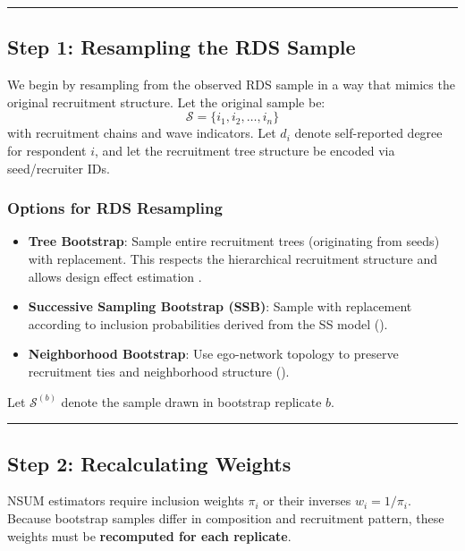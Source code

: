 \documentclass[
  12pt,
  letterpaper,
  DIV=11,
  numbers=noendperiod]{scrartcl}
\providecommand{\tightlist}{%
  \setlength{\itemsep}{0pt}\setlength{\parskip}{0pt}}
\theoremstyle{plain}
\theoremstyle{definition}
\begin{document}
\begin{center}\rule{0.5\linewidth}{0.5pt}\end{center}

\subsection{Step 1: Resampling the RDS
Sample}\label{step-1-resampling-the-rds-sample}

We begin by resampling from the observed RDS sample in a way that mimics
the original recruitment structure. Let the original sample be: \[
\mathcal{S} = \{i_1, i_2, \dots, i_n\}
\] with recruitment chains and wave indicators. Let \(d_i\) denote
self-reported degree for respondent \(i\), and let the recruitment tree
structure be encoded via seed/recruiter IDs.

\subsubsection{Options for RDS
Resampling}\label{options-for-rds-resampling}

\begin{itemize}
\tightlist
\item
  \textbf{Tree Bootstrap}: Sample entire recruitment trees (originating
  from seeds) with replacement. This respects the hierarchical
  recruitment structure and allows design effect estimation
  \autocite{salg06-variance}.
\item
  \textbf{Successive Sampling Bootstrap (SSB)}: Sample with replacement
  according to inclusion probabilities derived from the SS model
  (\textcite{gile11-improv}).
\item
  \textbf{Neighborhood Bootstrap}: Use ego-network topology to preserve
  recruitment ties and neighborhood structure
  (\textcite{yauc22-neighboor}).
\end{itemize}

Let \(\mathcal{S}^{(b)}\) denote the sample drawn in bootstrap replicate
\(b\).

\begin{center}\rule{0.5\linewidth}{0.5pt}\end{center}

\subsection{Step 2: Recalculating
Weights}\label{step-2-recalculating-weights}

NSUM estimators require inclusion weights \(\pi_i\) or their inverses
\(w_i = 1 / \pi_i\). Because bootstrap samples differ in composition and
recruitment pattern, these weights must be \textbf{recomputed for each
replicate}.
\end{document}

